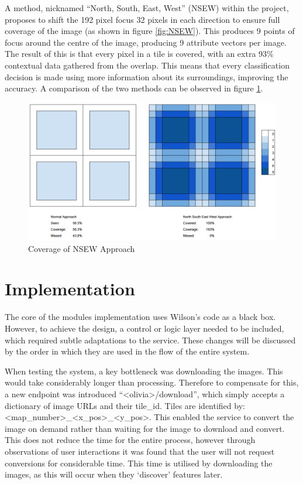 A method, nicknamed “North, South, East, West” (NSEW) within the project, proposes to shift the 192 pixel focus 32 pixels in each direction to ensure full coverage of the image (as shown in figure \ref{fig:NSEW}). This produces 9 points of focus around the centre of the image, producing 9 attribute vectors per image. The result of this is that every pixel in a tile is covered, with an extra 93\% contextual data gathered from the overlap. This means that every classification decision is made using more information about its surroundings, improving the accuracy. A comparison of the two methods can be observed in figure \ref{fig:NSEW_cover}.


\begin{figure}[H]
    \centering
    \includegraphics[width=12cm]{figs/7/NSEW}
    \caption{Coverage of NSEW Approach}
    \label{fig:NSEW_cover}
\end{figure}

\section{Implementation}

The core of the modules implementation uses Wilson’s code as a black box. However, to achieve the design, a control or logic layer needed to be included, which required subtle adaptations to the service. These changes will be discussed by the order in which they are used in the flow of the entire system. 

When testing the system, a key bottleneck was downloading the images. This would take considerably longer than processing. Therefore to compensate for this, a new endpoint was introduced ``\textless{}olivia\textgreater{}/download”, which simply accepts a dictionary of image URLs and their tile\_id. Tiles are identified by: \textless{}map\_number\textgreater{}\_\textless{}x\_pos\textgreater{}\_\textless{}y\_pos\textgreater{}. This enabled the service to convert the image on demand rather than waiting for the image to download and convert. This does not reduce the time for the entire process, however through observations of user interactions it was found that the user will not request conversions for considerable time. This time is utilised by downloading the images, as this will occur when they ‘discover’ features later.

